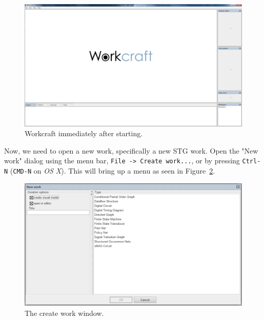 \documentclass{proc}
\begin{document}
\begin{figure}[H]
\begin{centering}
\includegraphics[scale=0.2]{images/blank_workcraft_screenshot}
\par\end{centering}

\begin{centering}
\protect\caption{\label{fig:blank_workcraft_screen}Workcraft immediately after starting.}

\par\end{centering}

\end{figure}

Now, we need to open a new work, specifically a new STG work. Open the "New work" dialog using the menu bar, \texttt{File -> Create work...}, or by pressing \texttt{Ctrl-N} 
(\texttt{CMD-N} on \emph{OS X}). This will bring up a menu as seen in Figure~\ref{fig:new_work_screen}.

\begin{figure}[H]
\begin{centering}
\includegraphics[scale=0.4]{images/new_work_screenshot}
\par\end{centering}

\begin{centering}
\protect\caption{\label{fig:new_work_screen}The create work window.}

\par\end{centering}

\end{figure}
\end{document}
